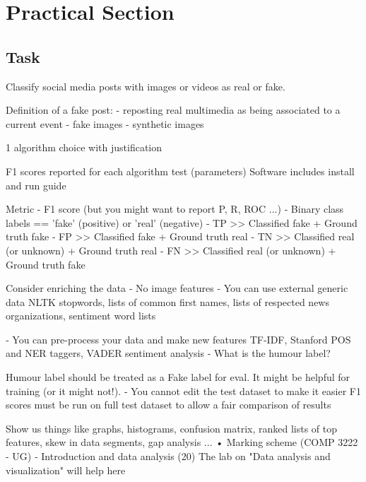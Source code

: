\section{Practical Section}

\subsection{Task}
Classify social media posts with images or videos as real or fake.

Definition of a fake post:
- reposting real multimedia as being associated to a current event
- fake images
- synthetic images

1 algorithm choice with justification

F1 scores reported for each algorithm test (parameters)
Software includes install and run guide

Metric - F1 score (but you might want to report P, R, ROC ...)
‐ Binary class labels == 'fake' (positive) or 'real' (negative)
‐ TP >> Classified fake + Ground truth fake
‐ FP >> Classified fake + Ground truth real
‐ TN >> Classified real (or unknown) + Ground truth real
‐ FN >> Classified real (or unknown) + Ground truth fake

 Consider enriching the data
‐ No image features
‐ You can use external generic data
NLTK stopwords, lists of common first names, lists of respected news
organizations, sentiment word lists

‐ You can pre-process your data and make new features
TF-IDF, Stanford POS and NER taggers, VADER sentiment analysis
‐ What is the humour label?

Humour label should be treated as a Fake label for eval. It might be
helpful for training (or it might not!).
‐ You cannot edit the test dataset to make it easier
F1 scores must be run on full test dataset to allow a fair comparison of results

Show us things like graphs, histograms, confusion matrix,
ranked lists of top features, skew in data segments, gap analysis ...
• Marking scheme (COMP 3222 - UG) ‐ Introduction and data analysis (20)
The lab on "Data analysis and visualization" will help here